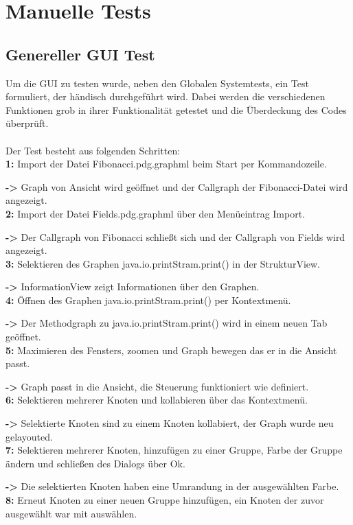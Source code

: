 \section{Manuelle Tests}
\subsection{Genereller GUI Test}
Um die GUI zu testen wurde, neben den Globalen Systemtests, ein Test formuliert, der händisch durchgeführt wird. Dabei werden die verschiedenen Funktionen grob in ihrer Funktionalität getestet und die Überdeckung des Codes überprüft. \\ \\
Der Test besteht aus folgenden Schritten: \\
\textbf{1:} Import der Datei Fibonacci.pdg.graphml beim Start per Kommandozeile. 

\textbf{->} Graph von Ansicht wird geöffnet und der Callgraph der Fibonacci-Datei wird angezeigt.\\
\textbf{2:} Import der Datei Fields.pdg.graphml über den Menüeintrag Import.

\textbf{->} Der Callgraph von Fibonacci schließt sich und der Callgraph von Fields wird angezeigt.\\
\textbf{3:} Selektieren des Graphen java.io.printStram.print() in der StrukturView.

\textbf{->} InformationView zeigt Informationen über den Graphen.\\
\textbf{4:} Öffnen des Graphen java.io.printStram.print() per Kontextmenü.

\textbf{->} Der Methodgraph zu java.io.printStram.print() wird in einem neuen Tab geöffnet.\\
\textbf{5:} Maximieren des Fensters, zoomen und Graph bewegen das er in die Ansicht passt.

\textbf{->} Graph passt in die Ansicht, die Steuerung funktioniert wie definiert.\\
\textbf{6:} Selektieren mehrerer Knoten und kollabieren über das Kontextmenü.

\textbf{->} Selektierte Knoten sind zu einem Knoten kollabiert, der Graph wurde neu gelayouted.\\
\textbf{7:} Selektieren mehrerer Knoten, hinzufügen zu einer Gruppe, Farbe der Gruppe ändern und schließen des Dialogs über Ok.

\textbf{->} Die selektierten Knoten haben eine Umrandung in der ausgewählten Farbe.\\
\textbf{8:} Erneut Knoten zu einer neuen Gruppe hinzufügen, ein Knoten der zuvor ausgewählt war mit auswählen.

